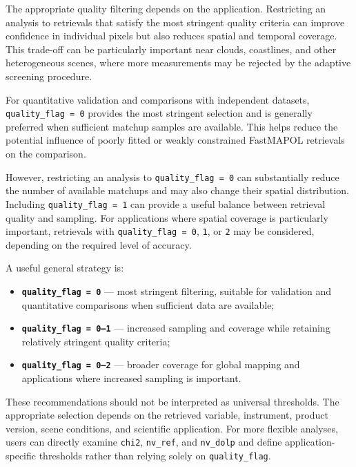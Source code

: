 \documentclass[
  11pt,
  letterpaper,
]{scrreprt}
\providecommand{\tightlist}{%
  \setlength{\itemsep}{0pt}\setlength{\parskip}{0pt}}
\begin{document}
The appropriate quality filtering depends on the application.
Restricting an analysis to retrievals that satisfy the most stringent
quality criteria can improve confidence in individual pixels but also
reduces spatial and temporal coverage. This trade-off can be
particularly important near clouds, coastlines, and other heterogeneous
scenes, where more measurements may be rejected by the adaptive
screening procedure.

For quantitative validation and comparisons with independent datasets,
\texttt{quality\_flag\ =\ 0} provides the most stringent selection and
is generally preferred when sufficient matchup samples are available.
This helps reduce the potential influence of poorly fitted or weakly
constrained FastMAPOL retrievals on the comparison.

However, restricting an analysis to \texttt{quality\_flag\ =\ 0} can
substantially reduce the number of available matchups and may also
change their spatial distribution. Including
\texttt{quality\_flag\ =\ 1} can provide a useful balance between
retrieval quality and sampling. For applications where spatial coverage
is particularly important, retrievals with \texttt{quality\_flag\ =\ 0},
\texttt{1}, or \texttt{2} may be considered, depending on the required
level of accuracy.

A useful general strategy is:

\begin{itemize}
\tightlist
\item
  \textbf{\texttt{quality\_flag\ =\ 0}} --- most stringent filtering,
  suitable for validation and quantitative comparisons when sufficient
  data are available;
\item
  \textbf{\texttt{quality\_flag\ =\ 0–1}} --- increased sampling and
  coverage while retaining relatively stringent quality criteria;
\item
  \textbf{\texttt{quality\_flag\ =\ 0–2}} --- broader coverage for
  global mapping and applications where increased sampling is important.
\end{itemize}

These recommendations should not be interpreted as universal thresholds.
The appropriate selection depends on the retrieved variable, instrument,
product version, scene conditions, and scientific application. For more
flexible analyses, users can directly examine \texttt{chi2},
\texttt{nv\_ref}, and \texttt{nv\_dolp} and define application-specific
thresholds rather than relying solely on \texttt{quality\_flag}.
\end{document}
